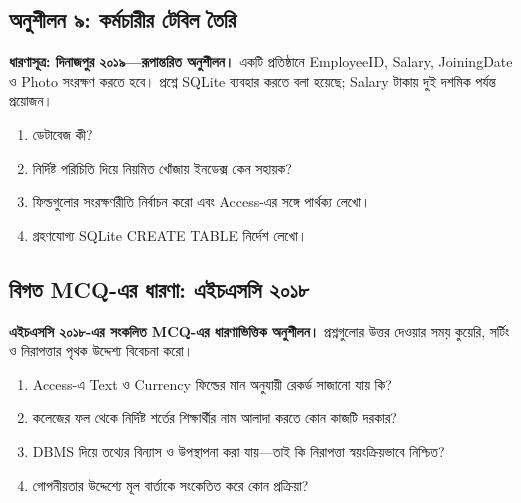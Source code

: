 \subsection{অনুশীলন ৯: কর্মচারীর টেবিল তৈরি}
\textbf{ধারণাসূত্র: দিনাজপুর ২০১৯—রূপান্তরিত অনুশীলন।}
একটি প্রতিষ্ঠানে EmployeeID, Salary, JoiningDate ও Photo সংরক্ষণ করতে হবে। প্রশ্নে SQLite ব্যবহার করতে বলা হয়েছে; Salary টাকায় দুই দশমিক পর্যন্ত প্রয়োজন।
\begin{enumerate}
\item[ক.] ডেটাবেজ কী?
\item[খ.] নির্দিষ্ট পরিচিতি দিয়ে নিয়মিত খোঁজায় ইনডেক্স কেন সহায়ক?
\item[গ.] ফিল্ডগুলোর সংরক্ষণরীতি নির্বাচন করো এবং Access-এর সঙ্গে পার্থক্য লেখো।
\item[ঘ.] গ্রহণযোগ্য SQLite CREATE TABLE নির্দেশ লেখো।
\end{enumerate}
\subsection{বিগত MCQ-এর ধারণা: এইচএসসি ২০১৮}
\textbf{এইচএসসি ২০১৮-এর সংকলিত MCQ-এর ধারণাভিত্তিক অনুশীলন।} প্রশ্নগুলোর উত্তর দেওয়ার সময় কুয়েরি, সর্টিং ও নিরাপত্তার পৃথক উদ্দেশ্য বিবেচনা করো।
\begin{enumerate}
\item Access-এ Text ও Currency ফিল্ডের মান অনুযায়ী রেকর্ড সাজানো যায় কি?\\
\item কলেজের ফল থেকে নির্দিষ্ট শর্তের শিক্ষার্থীর নাম আলাদা করতে কোন কাজটি দরকার?\\
\item DBMS দিয়ে তথ্যের বিন্যাস ও উপস্থাপনা করা যায়—তাই কি নিরাপত্তা স্বয়ংক্রিয়ভাবে নিশ্চিত?\\
\item গোপনীয়তার উদ্দেশ্যে মূল বার্তাকে সংকেতিত করে কোন প্রক্রিয়া?\\
\end{enumerate}
